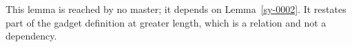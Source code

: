 \begin{lemma}[Loose]\label{sy-0009}
This lemma is reached by no master; it depends on Lemma~\ref{sy-0002}. It restates part of the gadget definition at greater length, which is a relation and not a dependency.
\end{lemma}